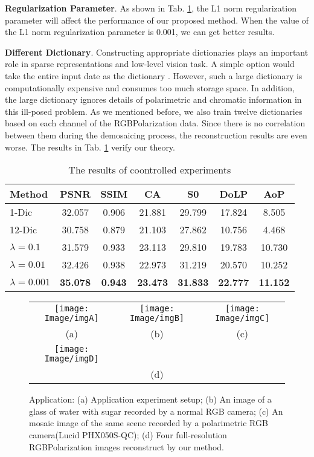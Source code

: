 \documentclass[10pt,twocolumn,letterpaper]{article}
\begin{document}
\textbf{Regularization Parameter}. As shown in Tab. \cref{tab:table3}, the L1 norm regularization parameter will affect the performance of our proposed method. When the value of the L1 norm regularization parameter is 0.001, we can get better results.

\textbf{Different Dictionary}. Constructing appropriate dictionaries plays an important role in sparse representations and low-level vision task. A simple option would take the entire input date as the dictionary \cite{37_ICLM}. However, such a large dictionary is computationally expensive and consumes too much storage space. In addition, the large dictionary ignores details of polarimetric and chromatic information in this ill-posed problem. As we mentioned before, we also train twelve dictionaries based on each channel of the RGBPolarization data. Since there is no correlation between them during the demosaicing process, the reconstruction results are even worse. The results in Tab. \cref{tab:table3} verify our theory.

\begin{table}[H]
    \centering
    \begin{tabular}{l|cccccc}
        \hline
        Method & PSNR  & SSIM & CA & S0 & DoLP & AoP \\
        \hline
        {1-Dic} & 32.057 & 0.906 & 21.881 & 29.799 & 17.824 & 8.505\\
        {12-Dic}& 30.758 & 0.879 & 21.103 & 27.862 & 10.756 & 4.468 \\
        {$\lambda = 0.1$} & 31.579 & 0.933 & 23.113 & 29.810 & 19.783 & 10.730\\
        {$\lambda = 0.01$} & 32.426 & 0.938 & 22.973 & 31.219 & 20.570 & 10.252\\
        {$\lambda = 0.001$} & \textbf{35.078} & \textbf{0.943} & \textbf{23.473} & \textbf{31.833} & \textbf{22.777} & \textbf{11.152}\\
        \hline
    \end{tabular}
    \caption{The results of coontrolled experiments}
    \label{tab:table3}
\end{table}

\begin{figure}[H]
    \centering
    \begin{tabular}{ccc}
         \texttt{[image: Image/imgA]} &  
         \texttt{[image: Image/imgB]} & 
         \texttt{[image: Image/imgC]} 
         \\ (a) & (b) & (c) \\
         \texttt{[image: Image/imgD]}
         \\  & (d) & \\
    \end{tabular}
    \caption{Application: (a) Application experiment setup; (b) An image of a glass of water with sugar recorded by a normal RGB camera; (c) An mosaic image of the same scene recorded by a polarimetric RGB camera(Lucid PHX050S-QC); (d) Four full-resolution RGBPolarization images reconstruct by our method.}
    \label{fig:Application}
\end{figure}
\end{document}
